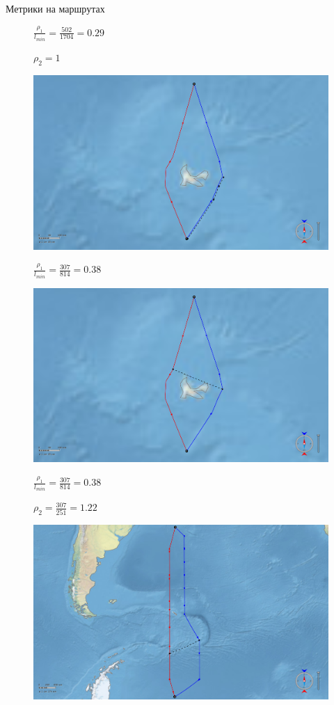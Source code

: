 \documentclass[russian, hyperref={unicode}]{beamer}
\begin{document}
\begin{frame}[t]{Метрики на маршрутах}
{\begin{figure}
            $\frac{\rho_1}{l_{min}} = \frac{502}{1704} = 0.29$

            $\rho_2 = 1$
        \end{figure}
    }
     {
        \begin{figure}
            \includegraphics[width=.9\textwidth]{Solution/metrics/1-uncertain-2-dissimilar-gclosest}
            
            $\frac{\rho_1}{l_{min}} = \frac{307}{814} = 0.38$
        \end{figure}
    }
     {
        \begin{figure}
            \includegraphics[width=.9\textwidth]{Solution/metrics/1-uncertain-2-dissimilar-closest}
            
            $\frac{\rho_1}{l_{min}} = \frac{307}{814} = 0.38$

            $\rho_2 = \frac{307}{251} = 1.22$
        \end{figure}
    }
     {
        \begin{figure}
            \includegraphics[width=.9\textwidth]{Solution/metrics/1-similar}
            

\end{figure}}
\end{frame}
\end{document}
